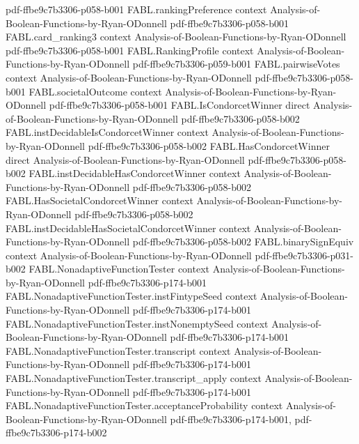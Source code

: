 \begin{theorem}
  {pdf-ffbe9c7b3306-p058-b001}
\proofstep
  {FABL.rankingPreference}
  {context}
  {Analysis-of-Boolean-Functions-by-Ryan-ODonnell}
  {pdf-ffbe9c7b3306-p058-b001}
\proofstep
  {FABL.card_ranking3}
  {context}
  {Analysis-of-Boolean-Functions-by-Ryan-ODonnell}
  {pdf-ffbe9c7b3306-p058-b001}
\proofstep
  {FABL.RankingProfile}
  {context}
  {Analysis-of-Boolean-Functions-by-Ryan-ODonnell}
  {pdf-ffbe9c7b3306-p059-b001}
\proofstep
  {FABL.pairwiseVotes}
  {context}
  {Analysis-of-Boolean-Functions-by-Ryan-ODonnell}
  {pdf-ffbe9c7b3306-p058-b001}
\proofstep
  {FABL.societalOutcome}
  {context}
  {Analysis-of-Boolean-Functions-by-Ryan-ODonnell}
  {pdf-ffbe9c7b3306-p058-b001}
\proofstep
  {FABL.IsCondorcetWinner}
  {direct}
  {Analysis-of-Boolean-Functions-by-Ryan-ODonnell}
  {pdf-ffbe9c7b3306-p058-b002}
\proofstep
  {FABL.instDecidableIsCondorcetWinner}
  {context}
  {Analysis-of-Boolean-Functions-by-Ryan-ODonnell}
  {pdf-ffbe9c7b3306-p058-b002}
\proofstep
  {FABL.HasCondorcetWinner}
  {direct}
  {Analysis-of-Boolean-Functions-by-Ryan-ODonnell}
  {pdf-ffbe9c7b3306-p058-b002}
\proofstep
  {FABL.instDecidableHasCondorcetWinner}
  {context}
  {Analysis-of-Boolean-Functions-by-Ryan-ODonnell}
  {pdf-ffbe9c7b3306-p058-b002}
\proofstep
  {FABL.HasSocietalCondorcetWinner}
  {context}
  {Analysis-of-Boolean-Functions-by-Ryan-ODonnell}
  {pdf-ffbe9c7b3306-p058-b002}
\proofstep
  {FABL.instDecidableHasSocietalCondorcetWinner}
  {context}
  {Analysis-of-Boolean-Functions-by-Ryan-ODonnell}
  {pdf-ffbe9c7b3306-p058-b002}
\proofstep
  {FABL.binarySignEquiv}
  {context}
  {Analysis-of-Boolean-Functions-by-Ryan-ODonnell}
  {pdf-ffbe9c7b3306-p031-b002}
\proofstep
  {FABL.NonadaptiveFunctionTester}
  {context}
  {Analysis-of-Boolean-Functions-by-Ryan-ODonnell}
  {pdf-ffbe9c7b3306-p174-b001}
\proofstep
  {FABL.NonadaptiveFunctionTester.instFintypeSeed}
  {context}
  {Analysis-of-Boolean-Functions-by-Ryan-ODonnell}
  {pdf-ffbe9c7b3306-p174-b001}
\proofstep
  {FABL.NonadaptiveFunctionTester.instNonemptySeed}
  {context}
  {Analysis-of-Boolean-Functions-by-Ryan-ODonnell}
  {pdf-ffbe9c7b3306-p174-b001}
\proofstep
  {FABL.NonadaptiveFunctionTester.transcript}
  {context}
  {Analysis-of-Boolean-Functions-by-Ryan-ODonnell}
  {pdf-ffbe9c7b3306-p174-b001}
\proofstep
  {FABL.NonadaptiveFunctionTester.transcript_apply}
  {context}
  {Analysis-of-Boolean-Functions-by-Ryan-ODonnell}
  {pdf-ffbe9c7b3306-p174-b001}
\proofstep
  {FABL.NonadaptiveFunctionTester.acceptanceProbability}
  {context}
  {Analysis-of-Boolean-Functions-by-Ryan-ODonnell}
  {pdf-ffbe9c7b3306-p174-b001,
    pdf-ffbe9c7b3306-p174-b002}

\end{theorem}
